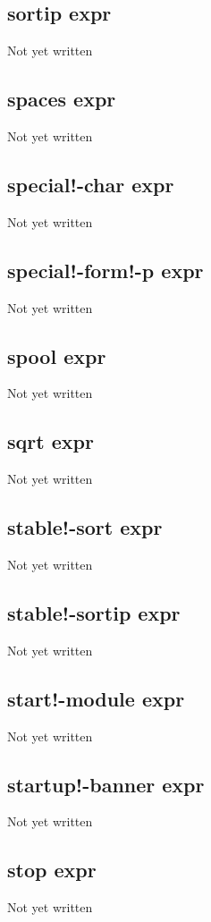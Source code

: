 \documentclass[a4paper,11pt]{article}
\begin{document}
{\subsection{\ttfamily sortip expr}
   Not yet written

\subsection{\ttfamily spaces expr}
   Not yet written

\subsection{\ttfamily special!-char expr}
   Not yet written

\subsection{\ttfamily special!-form!-p expr}
   Not yet written

\subsection{\ttfamily spool expr}
   Not yet written

\subsection{\ttfamily sqrt expr}
   Not yet written

\subsection{\ttfamily stable!-sort expr}
   Not yet written

\subsection{\ttfamily stable!-sortip expr}
   Not yet written

\subsection{\ttfamily start!-module expr}
   Not yet written

\subsection{\ttfamily startup!-banner expr}
   Not yet written

\subsection{\ttfamily stop expr}
   Not yet written

}
\end{document}
